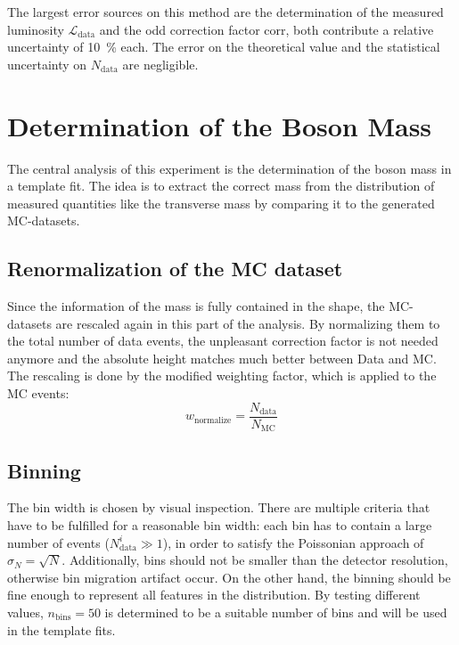 \documentclass[
	paper=A4,
	parskip=full,
	chapterprefix=true,
	12pt,
	headings=normal,
	bibliography=totoc,
	listof=totoc,
	titlepage=on,
]{scrreprt}
\begin{document}
The largest error sources on this method are the determination of the measured luminosity $\mathcal{L}_\mathrm{data}$ and the odd correction factor $\mathrm{corr}$, both contribute a relative uncertainty of \SI{10}{\percent} each. The error on the theoretical value and the statistical uncertainty on $N_\mathrm{data}$ are negligible.

\chapter{Determination of the \PW Boson Mass}
The central analysis of this experiment is the determination of the \PW boson mass in a template fit. The idea is to extract the correct \PW mass from the distribution of measured quantities like the transverse mass by comparing it to the generated MC-datasets. 


\section{Renormalization of the MC dataset}
Since the information of the \PW mass is fully contained in the shape, the MC-datasets are rescaled again in this part of the analysis. By normalizing them to the total number of data events, the unpleasant correction factor is not needed anymore and the absolute height matches much better between Data and MC. The rescaling is done by the modified weighting factor, which is applied to the MC events:
\begin{equation}
w_{\mathrm{normalize}}=\frac{N_{\mathrm{data}}}{N_{\mathrm{MC}}}
\end{equation}

\section{Binning}
The bin width is chosen by visual inspection. There are multiple criteria that have to be fulfilled for a reasonable bin width: each bin has to contain a large number of events ($N^i_\mathrm{data} \gg 1$), in order to satisfy the Poissonian approach of $\sigma_N = \sqrt{N}$. Additionally, bins should not be smaller than the detector resolution, otherwise bin migration artifact occur. On the other hand, the binning should be fine enough to represent all features in the distribution. By testing different values, $n_\mathrm{bins}=\num{50}$ is determined to be a suitable number of bins and will be used in the template fits.
\end{document}
